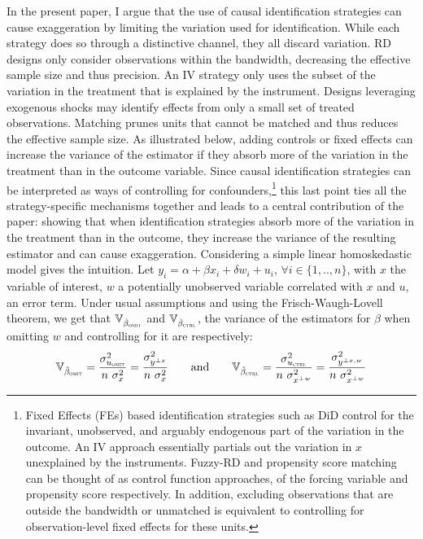 			In the present paper, I argue that the use of causal identification strategies can cause exaggeration by limiting the variation used for identification. While each strategy does so through a distinctive channel, they all discard variation. RD designs only consider observations within the bandwidth, decreasing the effective sample size and thus precision. An IV strategy only uses the subset of the variation in the treatment that is explained by the instrument. Designs leveraging exogenous shocks may identify effects from only a small set of treated observations. Matching prunes units that cannot be matched and thus reduces the effective sample size. As illustrated below, adding controls or fixed effects can increase the variance of the estimator if they absorb more of the variation in the treatment than in the outcome variable. Since causal identification strategies can be interpreted as ways of controlling for confounders,\footnote{Fixed Effects (FEs) based identification strategies such as DiD control for the invariant, unobserved, and arguably endogenous part of the variation in the outcome. An IV approach essentially partials out the variation in $x$ unexplained by the instruments. Fuzzy-RD and propensity score matching can be thought of as control function approaches, of the forcing variable and propensity score respectively. In addition, excluding observations that are outside the bandwidth or unmatched is equivalent to controlling for observation-level fixed effects for these units.} this last point ties all the strategy-specific mechanisms together and leads to a central contribution of the paper: showing that when identification strategies absorb more of the variation in the treatment than in the outcome, they increase the variance of the resulting estimator and can cause exaggeration. Considering a simple linear homoskedastic model gives the intuition. Let $y_{i} = \alpha + \beta x_{i} + \delta w_{i} + u_{i}$, $\forall i \in \{1, .., n\}$,  with $x$ the variable of interest, $w$ a potentially unobserved variable correlated with $x$ and $u$, an error term. Under usual assumptions and using the Frisch-Waugh-Lovell theorem, we get that $ \mathbb{V}_{\hat{\beta}_{\textsc{omit}}}$ and $ \mathbb{V}_{\hat{\beta}_{\textsc{ctrl}}}$, the variance of the estimators for $\beta$ when omitting $w$ and controlling for it are respectively:
			~
			\[
				\mathbb{V}_{\hat{\beta}_{\textsc{omit}}} =
				 \dfrac{\sigma^{2}_{u_{\textsc{omit}}}}{n \ \sigma_{x}^{2}} =
				 \dfrac{\sigma^{2}_{y^{\perp x}}}{n \ \sigma_{x}^{2}}
				 \qquad \text{and} \qquad
				 \mathbb{V}_{\hat{\beta}_{\textsc{ctrl}}} = 
				 \dfrac{\sigma^{2}_{u_{\textsc{ctrl}}}}{n \ \sigma_{x^{\perp w}}^{2}} =
				  \dfrac{\sigma^{2}_{y^{\perp x, w}}}{n \ \sigma_{x^{\perp w}}^{2}}
			\]
			
